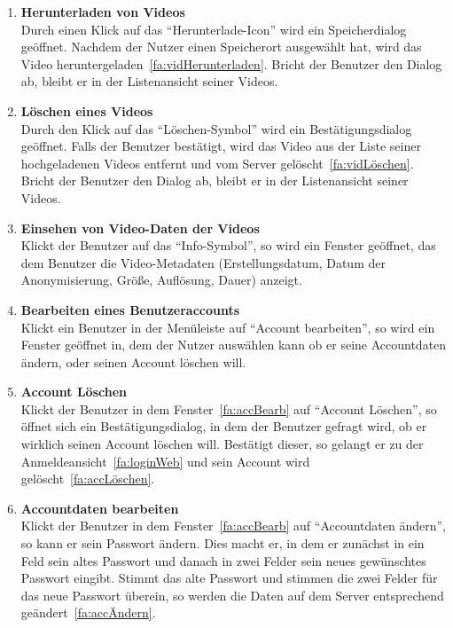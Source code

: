 \begin{enumerate}
\item \label{fa:anonymVidherunt}\textbf{Herunterladen von  Videos} \hfill \\
Durch einen Klick auf das ``Herunterlade-Icon'' wird ein Speicherdialog geöffnet. Nachdem der Nutzer einen Speicherort ausgewählt hat, wird das Video heruntergeladen~\eqref{fa:vidHerunterladen}. Bricht der Benutzer den Dialog ab, bleibt er in der Listenansicht seiner Videos.

\item \label{fa:anonymVidlösch}\textbf{Löschen eines  Videos} \hfill \\
Durch den Klick auf das ``Löschen-Symbol'' wird ein Bestätigungsdialog geöffnet. Falls der Benutzer bestätigt, wird das Video aus der Liste seiner hochgeladenen Videos entfernt und vom Server gelöscht~\eqref{fa:vidLöschen}. Bricht der Benutzer den Dialog ab, bleibt er in der Listenansicht seiner Videos.

\item \label{fa:anonymViddaten}\textbf{Einsehen von Video-Daten der  Videos} \hfill \\
Klickt der Benutzer auf das ``Info-Symbol'', so wird ein Fenster geöffnet, das dem Benutzer die Video-\gls{Metadaten} (Erstellungsdatum, Datum der Anonymisierung, Größe, Auflösung, Dauer) anzeigt.

\item \label{fa:accBearb}\textbf{Bearbeiten eines Benutzeraccounts} \hfill \\
Klickt ein Benutzer in der Menüleiste auf ``Account bearbeiten'', so wird ein Fenster geöffnet in, dem der Nutzer auswählen kann ob er seine Accountdaten ändern, oder seinen Account löschen will.

\item \label{fa:accLöschenWeb}\textbf{Account Löschen} \hfill \\
Klickt der Benutzer in dem Fenster~\eqref{fa:accBearb} auf ``Account Löschen'', so öffnet sich ein Bestätigungsdialog, in dem der Benutzer gefragt wird, ob er wirklich seinen Account löschen will. Bestätigt dieser, so gelangt er zu der Anmeldeansicht~\eqref{fa:loginWeb} und sein Account wird gelöscht~\eqref{fa:accLöschen}.

\item \label{fa:accDatBearb}\textbf{Accountdaten bearbeiten} \hfill \\
Klickt der Benutzer in dem Fenster~\eqref{fa:accBearb} auf ``Accountdaten ändern'', so kann er sein Passwort ändern. Dies macht er, in dem er zunächst in ein Feld sein altes Passwort und danach in zwei Felder sein neues gewünschtes Passwort eingibt. Stimmt das alte Passwort und stimmen die zwei Felder für das neue Passwort überein, so werden die Daten auf dem Server entsprechend geändert~\eqref{fa:accÄndern}.


\end{enumerate}
